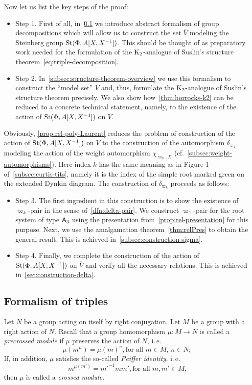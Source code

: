Now let us list the key steps of the proof:
\begin{itemize}
    \item Step 1. First of all, in~\cref{subsec:triples} we introduce abstract formalism of group decompositions which will allow us to construct the set $\overline{V}$ modeling the Steinberg group $\operatorname{St}(\Phi, A[X, X^{-1}])$.
                  This should be thought of as preparatory work needed for the formulation of the $\operatorname{K}_2$-analogue of Suslin's structure theorem~\eqref{eq:triple-decomposition}.
    \item Step 2. In~\cref{subsec:structure-theorem-overview} we use this formalism to construct the ``model set'' $\overline{V}$ and, thus, formulate the $\operatorname{K}_2$-analogue of Suslin's structure theorem precisely.
                  We also show how~\cref{thm:horrocks-k2} can be reduced to a concrete technical statement, namely,
                  to the existence of the action of $\operatorname{St}(\Phi, A[X, X^{-1}])$ on $\overline{V}$.
\end{itemize}
Obviously, \cref{prop:rel-poly-Laurent} reduces the problem of construction of the action of $\operatorname{St}(\Phi, A[X, X^{-1}])$ on $\overline{V}$ to the construction of
 the automorphism $\delta_{\varpi_k}$ modeling the action of the weight automorphism $\chi_{\varpi_k, X}$ (cf.~\cref{subsec:weight-automorphisms}).
Here index $k$ has the same meaning as in Figure 1 of~\cref{subsec:curtis-tits}, namely it is the index of the simple root marked green on the extended Dynkin diagram.
The construction of $\delta_{\varpi_k}$ proceeds as follows:
\begin{itemize}
    \item Step 3. The first ingredient in this construction is to show the existence of $\varpi_k$-pair in the sense of~\cref{dfn:delta-pair}.
                  We construct $\varpi_1$-pair for the root system of type $\mathsf{A}_3$ using the presentation from~\cref{prop:rel-presentation} for this purpose.
                  Next, we use the amalgamation theorem~\cref{thm:relPres} to obtain the general result.
                  This is achieved in~\cref{subsec:construction-sigma}.
    \item Step 4. Finally, we complete the construction of the action of $\operatorname{St}(\Phi, A[X, X^{-1}])$ on $\overline{V}$ and verify all the necessary relations.
                  This is achieved in~\cref{sec:construction-delta}.
\end{itemize}

\subsection{Formalism of triples}\label{subsec:triples}
Let $N$ be a group acting on itself by right conjugation.
Let $M$ be a group with a right action of $N$.
Recall that a group homomorphism $\mu\colon M \to N$ is called a \textit{precrossed module} if $\mu$ preserves the action of $N$, i.\,e.
\[\mu(m^n) = \mu(m)^n, \text{for all $m \in M$, $n\in N;$} \]
If, in addition, $\mu$ satisfies the so-called \textit{Peiffer identity}, i.\,e.
\[{m}^{\mu(m')} = {m'}^{-1} m m', \text{for all $m, m' \in M$,}\]
then $\mu$ is called a \textit{crossed module}.

